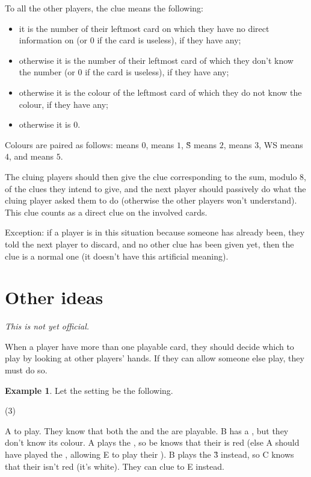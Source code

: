 \documentclass[a4paper]{article}
\theoremstyle{plain}
\theoremstyle{definition}
\newtheorem{example}[theorem]{Example}
\begin{document}
To all the other players, the clue means the following:

\begin{itemize}
	\item it is the number of their leftmost card on which they have no direct information on (or $0$ if the card is useless), if they have any;
	\item otherwise it is the number of their leftmost card of which they don't know the number (or $0$ if the card is useless), if they have any;
	\item otherwise it is the colour of the leftmost card of which they do not know the colour, if they have any;
	\item otherwise it is $0$. 
\end{itemize}

Colours are paired as follows:  means $0$,  means $1$, \G{S} means $2$,  means $3$, W{S} means $4$, and  means $5$.

The cluing players should then give the clue corresponding to the sum, modulo 8, of the clues they intend to give, and the next player should passively do what the cluing player asked them to do (otherwise the other players won't understand). This clue counts as a direct clue on the involved cards.

Exception: if a player is in this situation because someone has already been, they told the next player to discard, and no other clue has been given yet, then the clue is a normal one (it doesn't have this artificial meaning).

\section{Other ideas}

\textit{This is not yet official.}

When a player have more than one playable card, they should decide which to play by looking at other players' hands. If they can allow someone else play, they must do so.

\begin{example}
	
	Let the setting be the following.
	
	\begin{tasks}(3)
		\task[+]      
		\task[A]    
		\task[B]    
		\task[C]    
		\task[D]    
		\task[E]    
	\end{tasks}
	
	A to play. They know that both the  and the  are playable. B has a , but they don't know its colour. A plays the , so be knows that their  is red (else A should have played the , allowing E to play their ). B plays the \G{3} instead, so C knows that their  isn't red (it's white). They can clue  to E instead.
\end{example}
\end{document}
